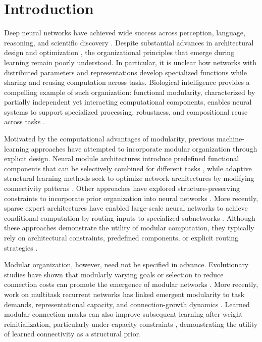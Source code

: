 \documentclass{article}
\begin{document}
\section{Introduction}

Deep neural networks have achieved wide success across perception, language, reasoning, and scientific discovery \cite{Bengio+chapter2007,Hinton06,goodfellow2016deep}. Despite substantial advances in architectural design \cite{heDeepResidualLearning2015,huangDenselyConnectedConvolutional2018} and optimization \cite{ruderOverviewGradientDescent2017}, the organizational principles that emerge during learning remain poorly understood. In particular, it is unclear how networks with distributed parameters and representations develop specialized functions while sharing and reusing computation across tasks. Biological intelligence provides a compelling example of such organization: functional modularity, characterized by partially independent yet interacting computational components, enables neural systems to support specialized processing, robustness, and compositional reuse across tasks \cite{damicelliTopologicalReinforcementPrinciple2019,margalitUnifyingFrameworkFunctional2024}.

Motivated by the computational advantages of modularity, previous machine-learning approaches have attempted to incorporate modular organization through explicit design. Neural module architectures introduce predefined functional components that can be selectively combined for different tasks \cite{andreasNeuralModuleNetworks2017,braylanReuseNeuralModules2015}, while adaptive structural learning methods seek to optimize network architectures by modifying connectivity patterns \cite{cortesAdaNetAdaptiveStructural2017,liuStructureLearningDeep2018}. Other approaches have explored structure-preserving constraints to incorporate prior organization into neural networks \cite{celledoniStructurepreservingDeepLearning2021}. More recently, sparse expert architectures have enabled large-scale neural networks to achieve conditional computation by routing inputs to specialized subnetworks \cite{shazeer2017outrageously,fedus2022switch}. Although these approaches demonstrate the utility of modular computation, they typically rely on architectural constraints, predefined components, or explicit routing strategies \cite{sunModularityDeepLearning2023}.

Modular organization, however, need not be specified in advance. Evolutionary studies have shown that modularly varying goals or selection to reduce connection costs can promote the emergence of modular networks \cite{kashtan2005spontaneous,clune2013evolutionary}. More recently, work on multitask recurrent networks has linked emergent modularity to task demands, representational capacity, and connection-growth dynamics \cite{wu2026taskstructured}. Learned modular connection masks can also improve subsequent learning after weight reinitialization, particularly under capacity constraints \cite{wu2026taskstructured}, demonstrating the utility of learned connectivity as a structural prior.
\end{document}
